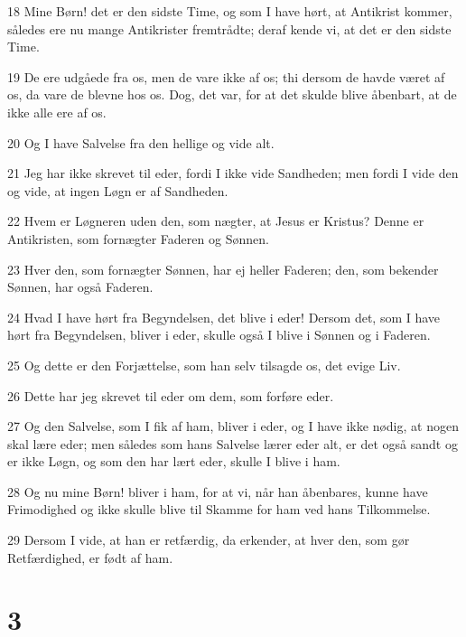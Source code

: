 \par 18 Mine Børn! det er den sidste Time, og som I have hørt, at Antikrist kommer, således ere nu mange Antikrister fremtrådte; deraf kende vi, at det er den sidste Time.
\par 19 De ere udgåede fra os, men de vare ikke af os; thi dersom de havde været af os, da vare de blevne hos os. Dog, det var, for at det skulde blive åbenbart, at de ikke alle ere af os.
\par 20 Og I have Salvelse fra den hellige og vide alt.
\par 21 Jeg har ikke skrevet til eder, fordi I ikke vide Sandheden; men fordi I vide den og vide, at ingen Løgn er af Sandheden.
\par 22 Hvem er Løgneren uden den, som nægter, at Jesus er Kristus? Denne er Antikristen, som fornægter Faderen og Sønnen.
\par 23 Hver den, som fornægter Sønnen, har ej heller Faderen; den, som bekender Sønnen, har også Faderen.
\par 24 Hvad I have hørt fra Begyndelsen, det blive i eder! Dersom det, som I have hørt fra Begyndelsen, bliver i eder, skulle også I blive i Sønnen og i Faderen.
\par 25 Og dette er den Forjættelse, som han selv tilsagde os, det evige Liv.
\par 26 Dette har jeg skrevet til eder om dem, som forføre eder.
\par 27 Og den Salvelse, som I fik af ham, bliver i eder, og I have ikke nødig, at nogen skal lære eder; men således som hans Salvelse lærer eder alt, er det også sandt og er ikke Løgn, og som den har lært eder, skulle I blive i ham.
\par 28 Og nu mine Børn! bliver i ham, for at vi, når han åbenbares, kunne have Frimodighed og ikke skulle blive til Skamme for ham ved hans Tilkommelse.
\par 29 Dersom I vide, at han er retfærdig, da erkender, at hver den, som gør Retfærdighed, er født af ham.

\chapter{3}

